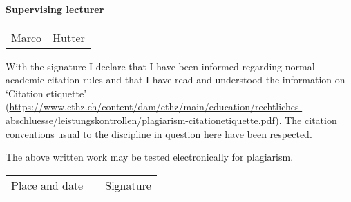 \vspace{0.5cm}

\textbf{Supervising lecturer}

\vspace{0.5cm}

\begin{tabular}{ p{5cm} p{5cm} }
  Marco & Hutter \\
\end{tabular}

\vspace{1cm}

With the signature I declare that I have been informed regarding normal academic citation rules and that I have read and understood the information on `Citation etiquette' (\url{https://www.ethz.ch/content/dam/ethz/main/education/rechtliches-abschluesse/leistungskontrollen/plagiarism-citationetiquette.pdf}).
The citation conventions usual to the discipline in question here have been respected.

\vspace{0.5cm}

The above written work may be tested electronically for plagiarism.

\vspace{4cm}

\begin{tabular}{ p{5cm} p{1cm} p{5cm} }
  \cline{1-1} \cline{3-3}
  Place and date & & Signature \\
\end{tabular}
